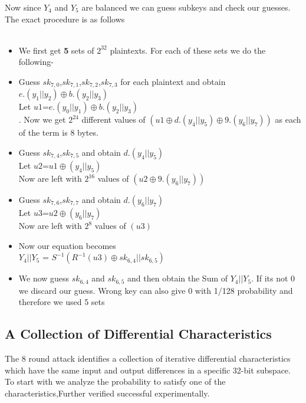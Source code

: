 \documentclass[preprint]{transcrypto}
\begin{document}
Now since $Y_{4}$ and $Y_{5}$ are balanced we can guess subkeys and check our guesses. \\ The exact procedure is as follows \\ \\
\begin{itemize}
	\item We first get \textbf{5} sets of $2^{32}$ plaintexts. For each of these sets we do the following-
	\item Guess $sk_{7,0}$,$sk_{7,1}$,$sk_{7,2}$,$sk_{7,3}$ for each plaintext and obtain $e.(y_{1}||y_{2})\oplus b.(y_{2}||y_{3})$\\
	Let $u1$=$e.(y_{0}||y_{1})\oplus b.(y_{2}||y_{3})$ \\.
	Now we get $2^{24}$ different values of $(u1\oplus d.(y_{4}||y_{5})\oplus9.(y_{6}|| y_{7}))$ as each of the term is 8 bytes.
	
	\item Guess $sk_{7,4}$,$sk_{7,5}$ and obtain 
	$d.(y_{4}||y_{5})$\\
	Let $u2$=$u1 \oplus (y_{4}||y_{5})$  \\  
	Now are left with $2^{16}$ values of $(u2\oplus9.(y_{6}|| y_{7}))$ \\
	\item Guess $sk_{7,6}$,$sk_{7,7}$ and obtain 
	$d.(y_{6}||y_{7})$\\
	Let $u3$=$u2 \oplus (y_{6}||y_{7})$  \\  
	Now are left with $2^8$ values of $(u3)$ \\
	 \item Now our equation becomes \\
	 $Y_{4}||Y_{5}$ = $S^{-1}(R^{-1}(u3)
	 \oplus sk_{6,4} || sk_{6,5})$\\
	 \item We now guess $sk_{6,4}$ and $sk_{6,5}$ and then obtain the Sum of $Y_{4}||Y_{5}$. If its not 0 we discard our guess. Wrong key can also give 0  with 1/128 probability and therefore we used 5 sets
\end{itemize}


\subsection{A Collection of Differential Characteristics} \cite{8round}
The 8 round attack identifies a collection of iterative differential characteristics which have
the same input and output differences in a specific 32-bit subspace. To start with we analyze the probability to satisfy one of the characteristics,Further verified successful experimentally.
\end{document}

